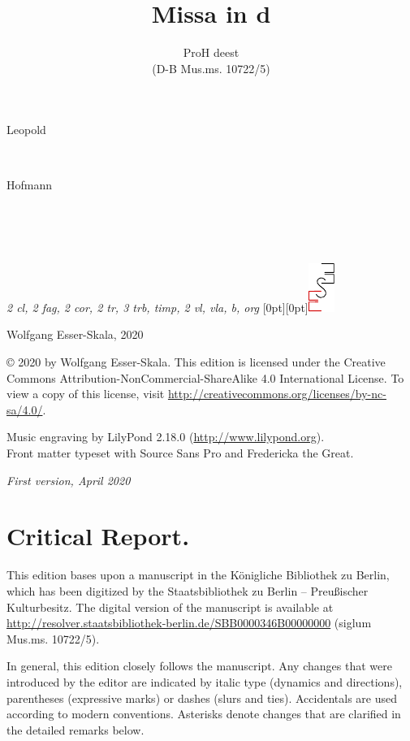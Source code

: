 \documentclass[parskip=full]{scrreprt}
\makeatletter
\DeclareRobustCommand{\sbseries}{\fontseries{sb}\selectfont}
\newcommand\fancytitlehead{
	\headingfont%
	\fontsize{80}{80}\selectfont\textcolor{black!80}{\@lastname.}\\[15pt]%
	\fontsize{60}{60}\selectfont\@title.%
}
\def\firstname#1{\def\@firstname{#1}}
\def\lastname#1{\def\@lastname{#1}}
\def\instrumentation#1{\def\@instrumentation{#1}}
\def\maketitle{%
\begin{titlepage}%
	\Large%
	{\@titlehead}%
	\vfill%
	{\strut\@firstname}\\%
	{\sbseries\color{oldred}\strut\@lastname}\\%
	{\strut\@namesuffix}%
	\vfill%
	{\sbseries\@title}\\%
	{\@subtitle}\\[\baselineskip]%
	{\itshape\@instrumentation}%
	\vfill%
	{\itshape\@parts}\hspace*{\fill}\raisebox{0pt}[0pt][0pt]{\includegraphics{ees_logo}}%
\end{titlepage}%
}
\newif\ifprintreport\printreportfalse
\makeatother
\begin{document}
\titlehead{\fancytitlehead}
\firstname{Leopold}
\lastname{Hofmann}
\title{Missa in d}
\subtitle{ProH deest\\(D-B Mus.ms. 10722/5)}
\instrumentation{2 cl, 2 fag, 2 cor, 2 tr, 3 trb, timp, 2 vl, vla, b, org}
\maketitle


\thispagestyle{empty}

\vspace*{\fill}

\hspace*{1em}Wolfgang Esser-Skala, 2020

© 2020 by Wolfgang Esser-Skala. This edition is licensed under the Creative Commons Attribution-NonCommercial-ShareAlike 4.0 International License. To view a copy of this license, visit \url{http://creativecommons.org/licenses/by-nc-sa/4.0/}. 

Music engraving by LilyPond 2.18.0 (\url{http://www.lilypond.org}).\\
Front matter typeset with Source Sans Pro and Fredericka the Great.

\textit{First version, April 2020}

\vspace*{2cm}

\ifprintreport
\chapter*{Critical Report.}

This edition bases upon a manuscript in the Königliche Bibliothek zu Berlin, which has been digitized by the Staatsbibliothek zu Berlin – Preußischer Kulturbesitz. The digital version of the manuscript is available at
	\url{http://resolver.staatsbibliothek-berlin.de/SBB0000346B00000000} (siglum Mus.ms. 10722/5).

In general, this edition closely follows the manuscript. Any changes that were introduced by the editor are indicated by italic type (dynamics and directions), parentheses (expressive marks) or dashes (slurs and ties). Accidentals are used according to modern conventions. Asterisks denote changes that are clarified in the detailed remarks below.
\end{document}
